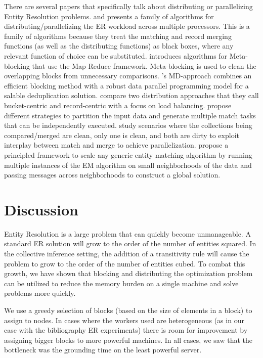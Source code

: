 \documentclass{article}
\begin{document}
        There are several papers that specifically talk about distributing or parallelizing Entity Resolution problems.
        \cite{benjelloun2007d} and \cite{kawai2006p} presents a family of algorithms for distributing/parallelizing the ER workload across multiple processors.
        This is a family of algorithms because they treat the matching and record merging functions (as well as the distributing functions) as black boxes, where any relevant function of choice can be substituted.
        \cite{efthymiou2017parallel} introduces algorithms for Meta-blocking that use the Map Reduce framework.
        Meta-blocking is used to clean the overlapping blocks from unnecessary comparisons.
        \cite{dal2011fast}'s MD-approach combines an efficient blocking method with a robust data parallel programming model for a salable deduplication solution.
        \cite{malhotra2014graph} compare two distribution approaches that they call bucket-centric and record-centric with a focus on load balancing.
        \cite{kirsten2010data} propose different strategies to partition the input data and generate multiple match tasks that can be independently executed.
        \cite{kim2007parallel} study scenarios where the collections being compared/merged are clean, only one is clean, and both are dirty to exploit interplay between match and merge to achieve parallelization.
        \cite{rastogi2011large} propose a principled framework to scale any generic entity matching algorithm by running multiple instances of the EM algorithm on small neighborhoods of the data and passing messages across neighborhoods to construct a global solution.


\section{Discussion}
    Entity Resolution is a large problem that can quickly become unmanageable. A standard ER solution will grow to the order of the number of entities squared. In the collective inference setting, the addition of a transitivity rule will cause the problem to grow to the order of the number of entities cubed. To combat this growth, we have shown that blocking and distributing the optimization problem can be utilized to reduce the memory burden on a single machine and solve problems more quickly.
    
    We use a greedy selection of blocks (based on the size of elements in a block) to assign to nodes. In cases where the workers used are heterogeneous (as in our case with the bibliography ER experiments) there is room for improvement by assigning bigger blocks to more powerful machines. In all cases, we saw that the bottleneck was the grounding time on the least powerful server. 
    
\end{document}
